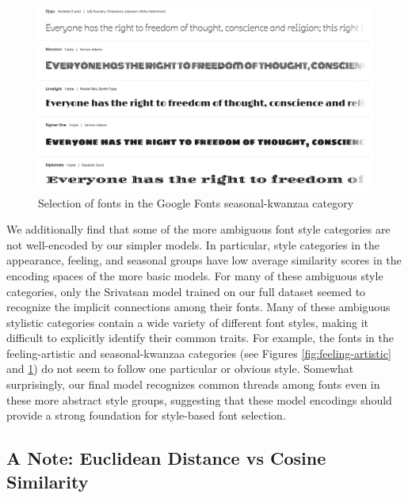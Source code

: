 \begin{figure}[]
    \centering
    \includegraphics[width=\textwidth]{images/seasonal-kwanzaa.png}
    \caption{Selection of fonts in the Google Fonts seasonal-kwanzaa category}
    \label{fig:seasonal-kwanzaa}
\end{figure}

We additionally find that some of the more ambiguous font style categories are not well-encoded by our simpler models. In particular, style categories in the appearance, feeling, and seasonal groups have low average similarity scores in the encoding spaces of the more basic models. For many of these ambiguous style categories, only the Srivatsan model trained on our full dataset seemed to recognize the implicit connections among their fonts. Many of these ambiguous stylistic categories contain a wide variety of different font styles, making it difficult to explicitly identify their common traits. For example, the fonts in the feeling-artistic and seasonal-kwanzaa categories (see Figures \ref{fig:feeling-artistic} and \ref{fig:seasonal-kwanzaa}) do not seem to follow one particular or obvious style. Somewhat surprisingly, our final model recognizes common threads among fonts even in these more abstract style groups, suggesting that these model encodings should provide a strong foundation for style-based font selection.

\subsection{A Note: Euclidean Distance vs Cosine Similarity}

